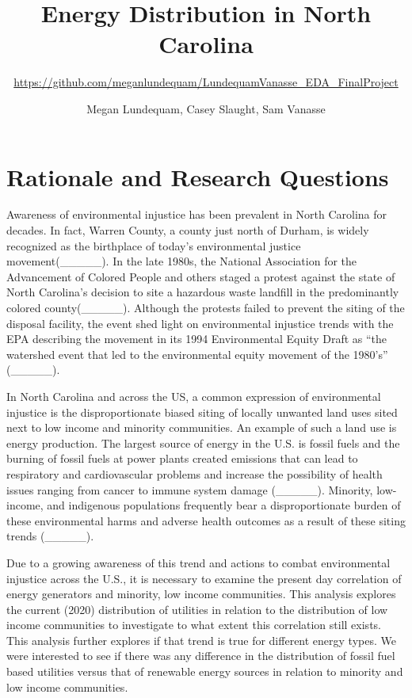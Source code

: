 \documentclass[
  12pt,
]{article}
\title{Energy Distribution in North Carolina}
\subtitle{\url{https://github.com/meganlundequam/LundequamVanasse_EDA_FinalProject}}
\author{Megan Lundequam, Casey Slaught, Sam Vanasse}
\date{}
\begin{document}
\maketitle

\newpage
\tableofcontents 
\newpage
\listoftables 
\newpage
\listoffigures 
\newpage

\hypertarget{rationale-and-research-questions}{%
\section{Rationale and Research
Questions}\label{rationale-and-research-questions}}

Awareness of environmental injustice has been prevalent in North
Carolina for decades. In fact, Warren County, a county just north of
Durham, is widely recognized as the birthplace of today's environmental
justice movement(\_\_\_\_\_). In the late 1980s, the National
Association for the Advancement of Colored People and others staged a
protest against the state of North Carolina's decision to site a
hazardous waste landfill in the predominantly colored
county(\_\_\_\_\_). Although the protests failed to prevent the siting
of the disposal facility, the event shed light on environmental
injustice trends with the EPA describing the movement in its 1994
Environmental Equity Draft as ``the watershed event that led to the
environmental equity movement of the 1980's'' (\_\_\_\_\_).

In North Carolina and across the US, a common expression of
environmental injustice is the disproportionate biased siting of locally
unwanted land uses sited next to low income and minority communities. An
example of such a land use is energy production. The largest source of
energy in the U.S. is fossil fuels and the burning of fossil fuels at
power plants created emissions that can lead to respiratory and
cardiovascular problems and increase the possibility of health issues
ranging from cancer to immune system damage (\_\_\_\_\_). Minority,
low-income, and indigenous populations frequently bear a
disproportionate burden of these environmental harms and adverse health
outcomes as a result of these siting trends (\_\_\_\_\_).

Due to a growing awareness of this trend and actions to combat
environmental injustice across the U.S., it is necessary to examine the
present day correlation of energy generators and minority, low income
communities. This analysis explores the current (2020) distribution of
utilities in relation to the distribution of low income communities to
investigate to what extent this correlation still exists. This analysis
further explores if that trend is true for different energy types. We
were interested to see if there was any difference in the distribution
of fossil fuel based utilities versus that of renewable energy sources
in relation to minority and low income communities.
\end{document}
